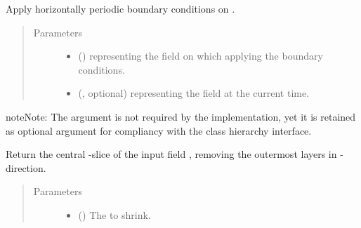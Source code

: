 \documentclass[letterpaper,10pt,english]{sphinxmanual}
\begin{document}
\begin{fulllineitems}

\begin{fulllineitems}
\label{\detokenize{api:dycore.horizontal_boundary.PeriodicYZ.apply}}
Apply horizontally periodic boundary conditions on .
\begin{quote}\begin{description}
\item[{Parameters}] \leavevmode\begin{itemize}
\item {} 
 () \textendash{}  representing the field on which applying the boundary conditions.

\item {} 
 (, optional) \textendash{}  representing the field at the current time.

\end{itemize}

\end{description}\end{quote}

\begin{sphinxadmonition}{note}{Note:}
The argument  is not required by the implementation, yet it is retained as optional
argument for compliancy with the class hierarchy interface.
\end{sphinxadmonition}

\end{fulllineitems}


\begin{fulllineitems}
\label{\detokenize{api:dycore.horizontal_boundary.PeriodicYZ.from_computational_to_physical_domain}}
Return the central -slice of the input field , removing the  outermost
layers in -direction.
\begin{quote}\begin{description}
\item[{Parameters}] \leavevmode\begin{itemize}
\item {} 
 () \textendash{} The  to shrink.


\end{itemize}
\end{description}
\end{quote}
\end{fulllineitems}
\end{fulllineitems}
\end{document}
